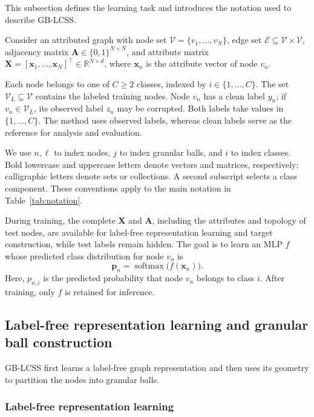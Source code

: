 \documentclass[times,review,10pt]{elsarticle}
\theoremstyle{definition}
\theoremstyle{plain}
\begin{document}
This subsection defines the learning task and introduces the notation used to describe GB-LCSS.

Consider an attributed graph with node set \(\mathcal V=\{v_1,\ldots,v_N\}\), edge set \(\mathcal E\subseteq\mathcal V\times\mathcal V\), adjacency matrix \(\mathbf A\in\{0,1\}^{N\times N}\), and attribute matrix \(\mathbf X=[\mathbf x_1,\ldots,\mathbf x_N]^\top\in\mathbb R^{N\times d}\), where \(\mathbf x_n\) is the attribute vector of node \(v_n\).

Each node belongs to one of \(C\geq2\) classes, indexed by \(i\in\{1,\ldots,C\}\). The set \(\mathcal V_L\subseteq\mathcal V\) contains the labeled training nodes. Node \(v_n\) has a clean label \(y_n\); if \(v_n\in\mathcal V_L\), its observed label \(z_n\) may be corrupted. Both labels take values in \(\{1,\ldots,C\}\). The method uses observed labels, whereas clean labels serve as the reference for analysis and evaluation.

We use \(n,\ell\) to index nodes, \(j\) to index granular balls, and \(i\) to index classes. Bold lowercase and uppercase letters denote vectors and matrices, respectively; calligraphic letters denote sets or collections. A second subscript selects a class component. These conventions apply to the main notation in Table~\ref{tab:notation}.


During training, the complete \(\mathbf X\) and \(\mathbf A\), including the attributes and topology of test nodes, are available for label-free representation learning and target construction, while test labels remain hidden. The goal is to learn an MLP \(f\) whose predicted class distribution for node \(v_n\) is
\begin{equation}\label{eq:1}
\mathbf p_n=\operatorname{softmax}\bigl(f(\mathbf x_n)\bigr).
\end{equation}
Here, \(p_{n,i}\) is the predicted probability that node \(v_n\) belongs to class \(i\). After training, only \(f\) is retained for inference.

\subsection{Label-free representation learning and granular ball construction}\label{sec:3.2}

GB-LCSS first learns a label-free graph representation and then uses its geometry to partition the nodes into granular balls.

\subsubsection{Label-free representation learning}\label{sec:3.2.1}
\end{document}
